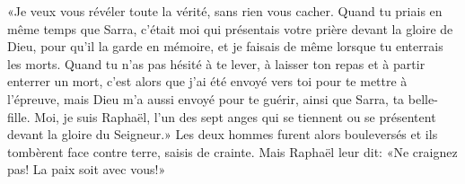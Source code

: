 «Je veux vous révéler toute la vérité, sans rien vous cacher. 
Quand tu priais en même temps que Sarra,
	c’était moi qui présentais votre prière devant la gloire de Dieu,
		pour qu’il la garde en mémoire,
	et je faisais de même lorsque tu enterrais les morts.
Quand tu n’as pas hésité à te lever,
		à laisser ton repas et à partir enterrer un mort,
	c’est alors que j’ai été envoyé vers toi pour te mettre à l’épreuve,
	mais Dieu m’a aussi envoyé pour te guérir, ainsi que Sarra, ta belle-fille.
Moi, je suis Raphaël,
	l’un des sept anges qui se tiennent ou se présentent
		devant la gloire du Seigneur.»
Les deux hommes furent alors bouleversés
	et ils tombèrent face contre terre, saisis de crainte.
Mais Raphaël leur dit: «Ne craignez pas!
	La paix soit avec vous!»
